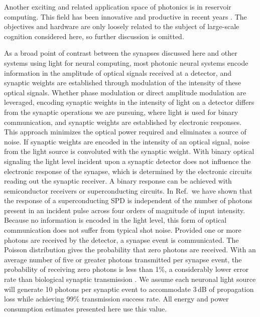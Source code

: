 \documentclass[twocolumn]{article}
\newcommand{\onlinecite}[1]{\hspace{-1 ex} \nocite{#1}\citenum{#1}}
\begin{document}
Another exciting and related application space of photonics is in reservoir computing. This field has been innovative and productive in recent years \cite{funa1993,vada2011,orso2015,vabr2017,brpe2018}. The objectives and hardware are only loosely related to the subject of large-scale cognition considered here, so further discussion is omitted. 

As a broad point of contrast between the synapses discussed here and other systems using light for neural computing, most photonic neural systems encode information in the amplitude of optical signals received at a detector, and synaptic weights are established through modulation of the intensity of these optical signals. Whether phase modulation or direct amplitude modulation are leveraged, encoding synaptic weights in the intensity of light on a detector differs from the synaptic operations we are pursuing, where light is used for binary communication, and synaptic weights are established by electronic responses. This approach minimizes the optical power required and eliminates a source of noise. If synaptic weights are encoded in the intensity of an optical signal, noise from the light source is convoluted with the synaptic weight. With binary optical signaling the light level incident upon a synaptic detector does not influence the electronic response of the synapse, which is determined by the electronic circuits reading out the synaptic receiver. A binary response can be achieved with semiconductor receivers or superconducting circuits. In Ref.\,\onlinecite{buta2020_2} we have shown that the response of a superconducting SPD is independent of the number of photons present in an incident pulse across four orders of magnitude of input intensity. Because no information is encoded in the light level, this form of optical communication does not suffer from typical shot noise. Provided one or more photons are received by the detector, a synapse event is communicated. The Poisson distribution gives the probability that zero photons are received. With an average number of five or greater photons transmitted per synapse event, the probability of receiving zero photons is less than 1\%, a considerably lower error rate than biological synaptic transmission \cite{li1997}. We assume each neuronal light source will generate 10 photons per synaptic event to accommodate 3\,dB of propagation loss while achieving 99\% transmission success rate. All energy and power consumption estimates presented here use this value.
\end{document}
